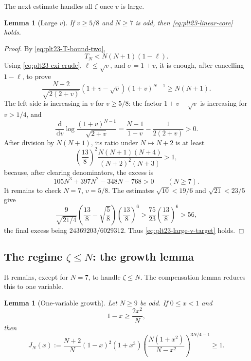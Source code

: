 \documentclass[11pt]{article}
\newtheorem{lemma}[theorem]{Lemma}
\numberwithin{equation}{section}
\newcommand{\dd}{\,\mathrm d}
\begin{document}
The next estimate handles all $\zeta$ once $v$ is large.

\begin{lemma}[Large $v$]\label{lem:plt23-linear-large-v}
  If $v\ge5/8$ and $N\ge7$ is odd, then \eqref{eq:plt23-linear-core} holds.
\end{lemma}

\begin{proof}
  By \eqref{eq:plt23-T-bound-two},
  \begin{equation}\label{eq:plt23-T-geometric-cancel}
    T_N<N(N+1)(1-\ell).
  \end{equation}
  Using \eqref{eq:plt23-cxi-crude}, $\ell\le\sqrt v$, and $\sigma=1+v$, it is enough, after cancelling $1-\ell$, to prove
  \begin{equation}\label{eq:plt23-large-v-target}
    \frac{N+2}{\sqrt{2(2+v)}}
    (1+v-\sqrt v)(1+v)^{N-1}
    \ge N(N+1).
  \end{equation}
  The left side is increasing in $v$ for $v\ge5/8$: the factor $1+v-\sqrt v$ is increasing for $v>1/4$, and
  \[
    \frac{\dd}{\dd v}\log\frac{(1+v)^{N-1}}{\sqrt{2+v}}
    =\frac{N-1}{1+v}-\frac{1}{2(2+v)}>0.
  \]
  After division by $N(N+1)$, its ratio under $N\mapsto N+2$ is at least
  \[
    \left(\frac{13}{8}\right)^2
    \frac{N(N+1)(N+4)}{(N+2)^2(N+3)}>1,
  \]
  because, after clearing denominators, the excess is
  \[
    105N^3+397N^2-348N-768>0
    \qquad(N\ge7).
  \]
  It remains to check $N=7$, $v=5/8$.
  The estimates $\sqrt{10}<19/6$ and $\sqrt{21}<23/5$ give
  \[
    \frac{9}{\sqrt{21/4}}
    \left(\frac{13}{8}-\sqrt{\frac{5}{8}}\right)
    \left(\frac{13}{8}\right)^6
    >\frac{75}{23}\left(\frac{13}{8}\right)^6
    >56,
  \]
  the final excess being $24369203/6029312$.
  Thus \eqref{eq:plt23-large-v-target} holds.
\end{proof}

\subsection{The regime \texorpdfstring{$\zeta\le N$}{zeta<=N}: the growth lemma}

It remains, except for $N=7$, to handle $\zeta\le N$.
The compensation lemma reduces this to one variable.

\begin{lemma}[One-variable growth]\label{lem:plt23-J-growth}
  Let $N\ge9$ be odd.
  If $0\le x<1$ and
  \begin{equation}\label{eq:plt23-J-domain}
    1-x\ge\frac{2x^2}{N},
  \end{equation}
  then
  \begin{equation}\label{eq:plt23-J-ineq}
    J_N(x):=
    \frac{N+2}{N}(1-x)^2(1+x^3)
    \left(\frac{N(1+x^2)}{N-x^2}\right)^{3N/4-1}
    \ge1.
  \end{equation}
\end{lemma}
\end{document}
